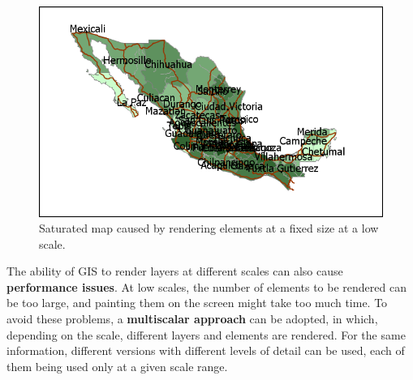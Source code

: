 \begin{figure}[!hbt]
\centering
\includegraphics[width=.9\columnwidth]{Visualization/SaturatedMap.png}
\caption{\small Saturated map caused by rendering elements at a fixed size at a low scale.}
\label{Fig:SaturatedMap} 
\end{figure}

The ability of GIS to render layers at different scales can also cause \textbf{performance issues}. At low scales, the number of elements to be rendered can be too large, and painting them on the screen might take too much time. To avoid these problems, a \textbf{multiscalar approach} can be adopted, in which, depending on the scale, different layers and elements are rendered. For the same information, different versions with different levels of detail can be used, each of them being used only at a given scale range.

\pagestyle{empty}